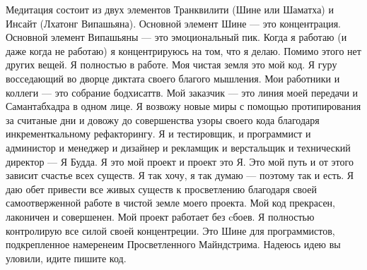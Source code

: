 Медитация состоит из двух элементов Транквилити (Шине или Шаматха) и Инсайт (Лхатонг Випашьяна). Основной элемент Шине — это концентрация. Основной элемент Випашьяны — это эмоциональный пик. Когда я работаю (и даже когда не работаю) я концентрируюсь на том, что я делаю. Помимо этого нет других вещей. Я полностью в работе. Моя чистая земля это мой код. Я гуру восседающий во дворце диктата своего благого мышления. Мои работники и коллеги — это собрание бодхисаттв. Мой заказчик — это линия моей передачи и Самантабхадра в одном лице. Я возвожу новые миры с помощью протипирования за считаные дни и довожу до совершенства узоры своего кода благодаря инкременткальному рефакторингу. Я и тестировщик, и программист и администор и менеджер и дизайнер и рекламщик и верстальщик и технический директор — Я Будда. Я это мой проект и проект это Я. Это мой путь и от этого зависит счастье всех существ. Я так хочу, я так думаю — поэтому так и есть. Я даю обет привести все живых существ к просветлению благодаря своей самоотверженной работе в чистой земле моего проекта. Мой код прекрасен, лаконичен и совершенен. Мой проект работает без cбоев. Я полностью контролирую все силой своей концентреции. Это Шине для программистов, подкрепленное намеренеим Просветленного Майндстрима. Надеюсь идею вы уловили, идите пишите код.
